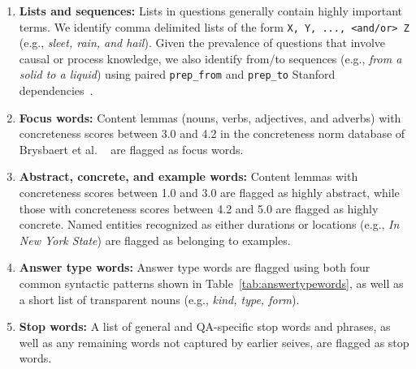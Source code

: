 \begin{enumerate}

\item {\bf Lists and sequences:} Lists in questions generally contain highly important terms.  We identify comma delimited lists of the form {\small {\tt X, Y, ..., <and/or> Z}} (e.g., {\em sleet, rain, and hail}). Given the prevalence of questions that involve causal or process knowledge, we also identify from/to sequences (e.g., {\em from a solid to a liquid}) using paired {\tt prep\_from} and {\tt prep\_to} Stanford dependencies~\cite{de2008stanford}. 

\item {\bf Focus words:} Content lemmas (nouns, verbs, adjectives, and adverbs) with concreteness scores between 3.0 and 4.2 in the concreteness norm database of Brysbaert et al. ~ are flagged as focus words. 

\item {\bf Abstract, concrete, and example words:} Content lemmas with concreteness scores between 1.0 and 3.0 are flagged as highly abstract, while those with concreteness scores between 4.2 and 5.0 are flagged as highly concrete.  Named entities recognized as either durations or locations (e.g., {\em In New York State}) are flagged as belonging to examples.  

\item {\bf Answer type words:} Answer type words are flagged using both four common syntactic patterns shown in Table~\ref{tab:answertypewords}, as well as a short list of transparent nouns (e.g., {\em kind, type, form}). 

\item {\bf Stop words: } A list of general and QA-specific stop words and phrases, as well as any remaining words not captured by earlier seives, are flagged as stop words.

\end{enumerate}

